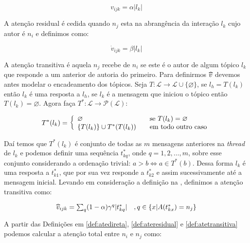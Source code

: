 \begin{equation}
\label{def:atedireta}
v_{ijk} = \alpha |l_k| 
\end{equation}

A atenção residual é cedida quando $n_j$ esta na abrangência da interação $l_k$
cujo autor é $n_i$ e definimos como:

\begin{equation}
\label{def:ateresidual}
\dot{v}_{ijk} = \beta |l_k|
\end{equation}

A atenção transitiva é aquela $n_j$ recebe de $n_i$ se este é o autor de algum
tópico $l_k$ que responde a um anterior de autoria do primeiro. Para definirmos
$\widetriangle{v}$ devemos antes modelar o encadeamento dos tópicos. Seja
$T:\mathscr{L}\to \mathscr{L}\cup\{\varnothing\}$, se $l_h=T(l_k)$ então
$l_k$ é uma resposta a $l_h$, se $l_k$ é a mensagem que iniciou o tópico então
$T(l_k)=\varnothing$. Agora faça $T^*:\mathscr{L}\to\mathscr{P}(\mathscr{L})$:

\begin{equation}
\label{def:thread}
T^*(l_k) = \left\{ \begin{array}{l l} \varnothing &\quad\text{se
$T(l_k)=\varnothing$}\\ \{T(l_k)\} \cup T^*(T(l_k)) &\quad\text{em todo outro
caso}\end{array} \right.
\end{equation}

Daí temos que $T^*(l_k)$ é conjunto de todas as $m$ mensagens anteriores na
\emph{thread} de $l_k$ e podemos definir uma sequência $t^*_{kq}$, onde
$q=1,2,\ldots,m$, sobre esse conjunto considerando a ordenação trivial: $a > b
\iff a\in T^*(b)$. Dessa forma $l_k$ é uma resposta a $t^*_{k1}$, que por sua
vez responde a $t^*_{k2}$ e assim sucessivamente até a mensagem inicial. Levando em
consideração a definição na , definimos a atenção
transitiva como:

\begin{equation}
\label{def:atetransitiva}
\begin{array}{ l l }
\widetriangle{v}_{ijk} = \sum_{q}(1-\alpha)\gamma^q|t^*_{kq}| 
&, q \in \{x | A(t^*_{kx}) = n_j\}
\end{array}
\end{equation}

A partir das Definições em \ref{def:atedireta}, \ref{def:ateresidual} e
\ref{def:atetransitiva} podemos calcular a atenção total entre $n_i$ e $n_j$
como:

